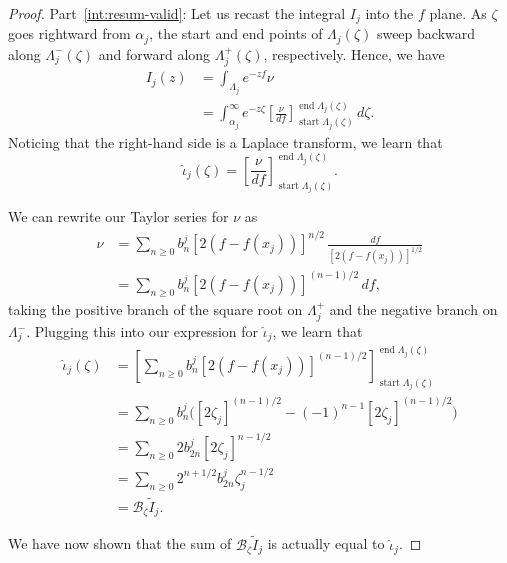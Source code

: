 \documentclass{article}
\theoremstyle{definition}
\newcommand{\borel}{\mathcal{B}}
\begin{document}
\begin{proof}
Part~\eqref{int:resum-valid}: Let us recast the integral $I_j$ into the $f$ plane. As $\zeta$ goes rightward from $\alpha_j$, the start and end points of $\Lambda_j(\zeta)$ sweep backward along $\Lambda^-_j(\zeta)$ and forward along $\Lambda^+_j(\zeta)$, respectively. Hence, we have
\begin{align*}
I_j(z) & = \int_{\Lambda_j} e^{-zf} \nu \\
& = \int_{\alpha_j}^\infty e^{-z\zeta} \left[\frac{\nu}{df}\right]_{\operatorname{start} \Lambda_j(\zeta)}^{\operatorname{end} \Lambda_j(\zeta)}\,d\zeta.
\end{align*}
Noticing that the right-hand side is a Laplace transform, we learn that
\begin{equation}\label{thimble-difference}
\hat{\iota}_j(\zeta) = \left[\frac{\nu}{df}\right]_{\operatorname{start} \Lambda_j(\zeta)}^{\operatorname{end} \Lambda_j(\zeta)}.
\end{equation}

We can rewrite our Taylor series for $\nu$ as
\begin{align*}
\nu & = \sum_{n \ge 0} b_n^j [2(f - f(x_j))]^{n/2}\,\frac{df}{[2(f - f(x_j))]^{1/2}} \\
& = \sum_{n \ge 0} b_n^j [2(f - f(x_j))]^{(n - 1)/2}\,df,
\end{align*}
taking the positive branch of the square root on $\Lambda^+_j$ and the negative branch on $\Lambda^-_j$. Plugging this into our expression for $\hat{\iota}_j$, we learn that
\begin{align*}
\hat{\iota}_j(\zeta) & = \left[ \sum_{n \ge 0} b_n^j [2(f - f(x_j))]^{(n - 1)/2} \right]_{\operatorname{start} \Lambda_j(\zeta)}^{\operatorname{end} \Lambda_j(\zeta)} \\
& = \sum_{n \ge 0} b_n^j \Big( [2\zeta_j]^{(n - 1)/2} - (-1)^{n-1}[2\zeta_j]^{(n - 1)/2} \Big) \\
& = \sum_{n \ge 0} 2 b_{2n}^j [2\zeta_j]^{n - 1/2} \\
& = \sum_{n \ge 0} 2^{n+1/2} b_{2n}^j \zeta_j^{n - 1/2} \\
& = \borel_{\zeta} \tilde{I}_j.
\end{align*}

We have now shown that the sum of $\borel_{\zeta} \tilde{I}_j$ is actually equal to $\hat{\iota}_j$.


\end{proof}
\end{document}
